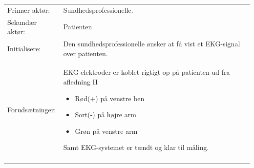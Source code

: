 \begin{table}[H]
\begin{tabularx}{\textwidth}{l X}
     Primær aktør:          &	Sundhedsprofessionelle.                                                                                                                                                                                                                                                                                                                                                                                                                                                                                                                                                                                                                 \\ \addlinespace[1mm] 
     Sekundær aktør:        &	Patienten                                                                                                                                                                                                                                                                                                                                                                                                                                                                                                                                                                                                                 \\ \addlinespace[1mm]  		                                                                                                                                                      
     Initialisere:          & 	Den sundhedsprofessionelle ønsker at få vist et EKG-signal over patienten.
		 \\ \addlinespace[1mm]                                                                                                                                                                                                                                                                                                             
     Forudsætninger:        & 	EKG-elektroder er koblet rigtigt op på patienten ud fra afledning II
     \begin{itemize}
     	\item Rød(+) på venstre ben
     	\item Sort(-) på højre arm
     	\item Grøn på venstre arm
     \end{itemize}
		Samt EKG-systemet er tændt og klar til måling.                                                                                                                                                                                                                                                                                                                                                                                                                                                                                                                                                                           \\ \addlinespace[1mm]                                                                                                                                                       

\end{tabularx}
\end{table}
